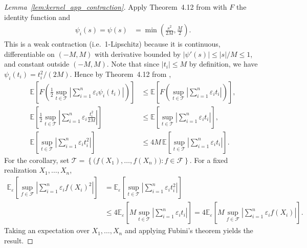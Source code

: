 \documentclass[11pt,lof]{puthesis}
\newcommand{\E}{\ensuremath{\mathbb{E}}}
\newcommand{\cF}{\ensuremath{\mathcal{F}}}
\newcommand{\cT}{\ensuremath{\mathcal{T}}}
\theoremstyle{break}
\theoremstyle{proof}
\newtheorem{proof}{Proof}
\begin{document}
\begin{proof}[Lemma~\ref{lem:kernel_app_contraction}]

  Apply Theorem~4.12 from \citet{ledoux1991probability} with $F$ the identity
  function and
  \begin{align*}
    \psi_i(s)
    = \psi(s)
    &=
    \min
    \left(
      \frac{s^2}{2M},
      \frac{M}{2}
    \right).
  \end{align*}
  This is a weak contraction
  (i.e.\ 1-Lipschitz)
  because it is continuous,
  differentiable on $(-M,M)$
  with derivative bounded by
  $|\psi'(s)| \leq |s|/M \leq 1$,
  and constant outside $(-M,M)$.
  Note that since $|t_i| \leq M$
  by definition,
  we have $\psi_i(t_i) = t_i^2 / (2M)$.
  Hence by Theorem~4.12 from \citet{ledoux1991probability},
  \begin{align*}
    \E
    \left[
      F
      \left(
        \frac{1}{2}
        \sup_{t \in \cT}
        \left|
        \sum_{i=1}^n
        \varepsilon_i
        \psi_i(t_i)
        \right|
      \right)
    \right]
    &\leq
    \E
    \left[
      F
      \left(
        \sup_{t \in \cT}
        \left|
        \sum_{i=1}^n
        \varepsilon_i
        t_i
        \right|
      \right)
    \right], \\
    \E
    \left[
      \frac{1}{2}
      \sup_{t \in \cT}
      \left|
      \sum_{i=1}^n
      \varepsilon_i
      \frac{t_i^2}{2M}
      \right|
    \right]
    &\leq
    \E
    \left[
      \sup_{t \in \cT}
      \left|
      \sum_{i=1}^n
      \varepsilon_i
      t_i
      \right|
    \right], \\
    \E
    \left[
      \sup_{t \in \cT}
      \left|
      \sum_{i=1}^n
      \varepsilon_i
      t_i^2
      \right|
    \right]
    &\leq
    4M \,
    \E
    \left[
      \sup_{t \in \cT}
      \left|
      \sum_{i=1}^n
      \varepsilon_i
      t_i
      \right|
    \right].
  \end{align*}
  For the corollary, set
  $\cT = \left\{\big(f(X_1), \ldots, f(X_n)\big) : f \in \cF\right\}$.
  For a fixed realization
  $X_1, \ldots, X_n$,
  \begin{align*}
    \E_\varepsilon
    \left[
      \sup_{f \in \cF}
      \left|
      \sum_{i=1}^n
      \varepsilon_i
      f(X_i)^2
      \right|
    \right]
    &=
    \E_\varepsilon
    \left[
      \sup_{t \in \cT}
      \left|
      \sum_{i=1}^n
      \varepsilon_i
      t_i^2
      \right|
    \right] \\
    &\leq 4
    \E_\varepsilon
    \left[
      M
      \sup_{t \in \cT}
      \left|
      \sum_{i=1}^n
      \varepsilon_i
      t_i
      \right|
    \right]
    = 4 \E_\varepsilon
    \left[
      M
      \sup_{f \in \cF}
      \left|
      \sum_{i=1}^n
      \varepsilon_i
      f(X_i)
      \right|
    \right].
  \end{align*}
  Taking an expectation over $X_1, \ldots, X_n$
  and applying Fubini's theorem yields the result.
\end{proof}
\end{document}
